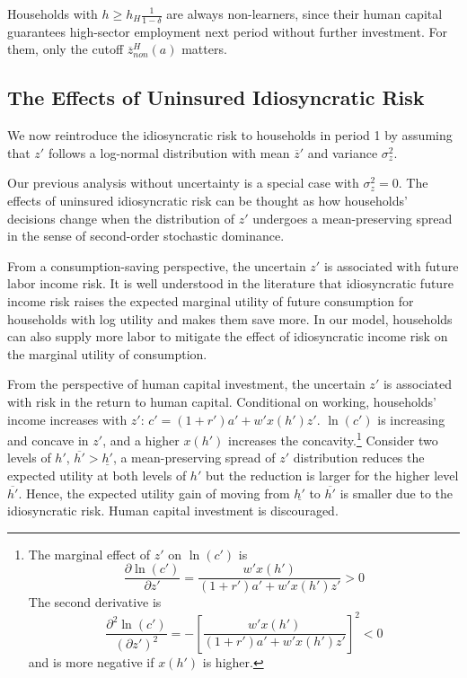\documentclass[12pt]{article}
\begin{document}
\bigskip
\noindent
Households with $h \geq h_H\frac{1}{1-\delta}$ are always non-learners, since their human capital guarantees high-sector employment next period without further investment. For them, only the cutoff $\overline{z}^H_{non}(a)$ matters.







\subsection{The Effects of Uninsured Idiosyncratic Risk}
We now reintroduce the idiosyncratic risk to households in period 1 by assuming that $z'$ follows a log-normal distribution with mean $\overline{z}'$ and variance $\sigma^2_z$. 

Our previous analysis without uncertainty is a special case with $\sigma^2_z=0$. The effects of uninsured idiosyncratic risk can be thought as how households' decisions change when the distribution of $z'$ undergoes a mean-preserving spread in the sense of second-order stochastic dominance.

From a consumption-saving perspective, the uncertain $z'$ is associated with future labor income risk. It is well understood in the literature that idiosyncratic future income risk raises the expected marginal utility of future consumption for households with log utility and makes them save more. In our model, households can also supply more labor to mitigate the effect of idiosyncratic income risk on the marginal utility of consumption. 

From the perspective of human capital investment, the uncertain $z'$ is associated with risk in the return to human capital. Conditional on working, households' income increases with $z'$: $c'=(1+r')a'+w'x(h')z'$. $\ln(c')$ is increasing and concave in $z'$, and a higher $x(h')$ increases the concavity.\footnote{The marginal effect of $z'$ on $\ln(c')$ is 
\begin{equation*}
    \frac{\partial\ln(c')}{\partial z'}=\frac{w'x(h')}{(1+r')a'+w'x(h')z'} > 0
\end{equation*}
The second derivative is 
\begin{equation*}
    \frac{\partial^2\ln(c')}{(\partial z')^2}=-\left[\frac{w'x(h')}{(1+r')a'+w'x(h')z'}\right]^2 <0
\end{equation*}
and is more negative if $x(h')$ is higher.} Consider two levels of $h'$, $\overline{h'}>\underline{h'}$, a mean-preserving spread of $z'$ distribution reduces the expected utility at both levels of $h'$ but the reduction is larger for the higher level $\overline{h'}$. Hence, the expected utility gain of moving from $\underline{h'}$ to $\overline{h'}$ is smaller due to the idiosyncratic risk. Human capital investment is discouraged.
\end{document}
